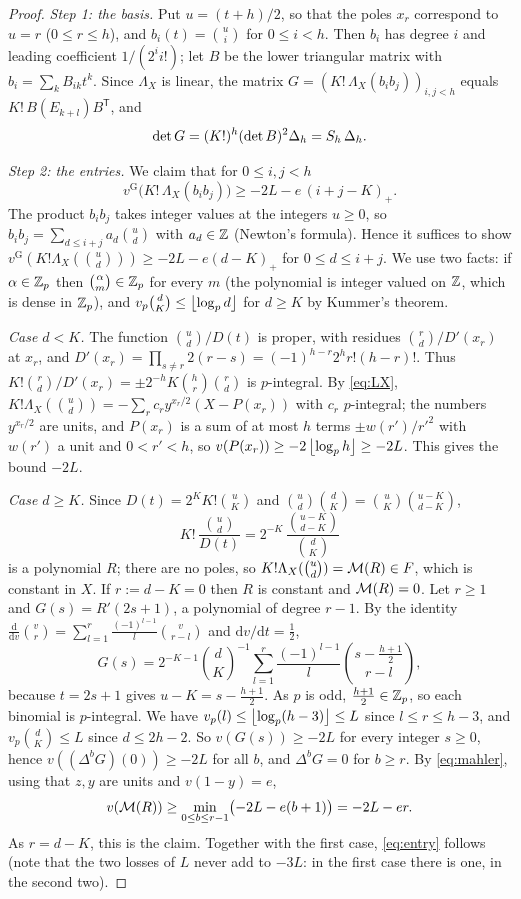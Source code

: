 \begin{proof}
\emph{Step 1: the basis.} Put $u=(t+h)/2$, so that the poles $x_r$ correspond to $u=r$
($0\le r\le h$), and $b_i(t)=\binom ui$ for $0\le i<h$. Then $b_i$ has degree $i$ and leading
coefficient $1/(2^ii!)$; let $B$ be the lower triangular matrix with $b_i=\sum_kB_{ik}t^k$.
Since $\Lambda_X$ is linear, the matrix $G=(K!\,\Lambda_X(b_ib_j))_{i,j<h}$ equals
$K!\,B(E_{k+l})B^{\mathsf T}$, and
\[
\det G=(K!)^h(\det B)^2\Delta_h=S_h\,\Delta_h .
\]

\emph{Step 2: the entries.} We claim that for $0\le i,j<h$
\begin{equation}\label{eq:entry}
v^{\mathrm G}\bigl(K!\,\Lambda_X(b_ib_j)\bigr)\ge-2L-e\,(i+j-K)_+ .
\end{equation}
The product $b_ib_j$ takes integer values at the integers $u\ge0$, so $b_ib_j=\sum_{d\le i+j}a_d\binom ud$
with $a_d\in\mathbb{Z}$ (Newton's formula). Hence it suffices to show
$v^{\mathrm G}(K!\Lambda_X(\binom ud))\ge-2L-e(d-K)_+$ for $0\le d\le i+j$. We use two facts: if $\alpha\in\mathbb{Z}_p$ then $\binom\alpha m\in\mathbb{Z}_p$ for every $m$ (the polynomial is integer
valued on $\mathbb{Z}$, which is dense in $\mathbb{Z}_p$), and $v_p\binom dK\le\left\lfloor \log_pd\right\rfloor$ for $d\ge K$ by Kummer's theorem.

\emph{Case $d<K$.} The function $\binom ud/D(t)$ is proper, with residues
$\binom rd/D'(x_r)$ at $x_r$, and $D'(x_r)=\prod_{s\ne r}2(r-s)=(-1)^{h-r}2^hr!(h-r)!$. Thus
$K!\binom rd/D'(x_r)=\pm2^{-h}K\binom hr\binom rd$ is $p$-integral. By \eqref{eq:LX},
$K!\Lambda_X(\binom ud)=-\sum_rc_ry^{x_r/2}(X-P(x_r))$ with $c_r$ $p$-integral; the numbers $y^{x_r/2}$
are units, and $P(x_r)$ is a sum of at most $h$ terms $\pm w(r')/r'^2$ with $w(r')$ a unit and
$0<r'<h$, so $v(P(x_r))\ge-2\left\lfloor \log_ph\right\rfloor\ge-2L$. This gives the bound $-2L$.

\emph{Case $d\ge K$.} Since $D(t)=2^KK!\binom uK$ and $\binom ud\binom dK=\binom uK\binom{u-K}{d-K}$,
\[
K!\,\frac{\binom ud}{D(t)}=2^{-K}\,\frac{\binom{u-K}{d-K}}{\binom dK}
\]
is a polynomial $R$; there are no poles, so $K!\Lambda_X(\binom ud)=\mathcal{M}(R)\in F$, which is constant
in $X$. If $r:=d-K=0$ then $R$ is constant and $\mathcal{M}(R)=0$. Let $r\ge1$ and $G(s)=R'(2s+1)$, a
polynomial of degree $r-1$. By the identity
$\frac{\mathrm d}{\mathrm dv}\binom vr=\sum_{l=1}^{r}\frac{(-1)^{l-1}}l\binom v{r-l}$ and $\mathrm dv/\mathrm dt=\frac12$,
\[
G(s)=2^{-K-1}\binom dK^{-1}\sum_{l=1}^r\frac{(-1)^{l-1}}l\binom{s-\frac{h+1}2}{r-l},
\]
because $t=2s+1$ gives $u-K=s-\frac{h+1}2$. As $p$ is odd, $\frac{h+1}2\in\mathbb{Z}_p$, so each binomial is
$p$-integral. We have $v_p(l)\le\left\lfloor \log_p(h-3)\right\rfloor\le L$ since $l\le r\le h-3$, and
$v_p\binom dK\le L$ since $d\le2h-2$. So $v(G(s))\ge-2L$ for every integer $s\ge0$, hence
$v((\Delta^bG)(0))\ge-2L$ for all $b$, and $\Delta^bG=0$ for $b\ge r$. By
\eqref{eq:mahler}, using that $z,y$ are units and $v(1-y)=e$,
\[
v(\mathcal{M}(R))\ge\min_{0\le b\le r-1}\bigl(-2L-e(b+1)\bigr)=-2L-er .
\]
As $r=d-K$, this is the claim. Together with the first case, \eqref{eq:entry} follows
(note that the two losses of $L$ never add to $-3L$: in the first case there is one, in the
second two).


\end{proof}

